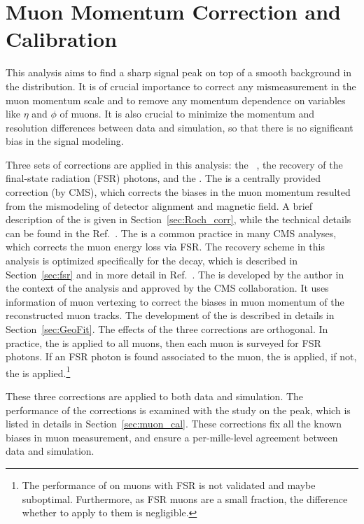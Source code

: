 \chapter{Muon Momentum Correction and Calibration} \label{chp:muon_corr}

This analysis aims to find a sharp signal peak on top of a smooth background in the \mmm distribution.
It is of crucial importance to correct any mismeasurement in the muon momentum scale 
and to remove any momentum dependence on variables like $\eta$ and $\phi$ of muons.
It is also crucial to minimize the momentum and resolution differences between data and simulation, 
so that there is no significant bias in the signal modeling.

Three sets of corrections are applied in this analysis: 
the \RochCorr~\cite{Bodek:2012id}, the recovery of the final-state radiation (FSR) photons, and the \GeoFit.
The \RochCorr is a centrally provided correction (by CMS), which corrects 
the biases in the muon momentum resulted from the mismodeling of detector alignment and magnetic field. 
A brief description of the \RochCorr is given in Section~\ref{sec:Roch_corr}, 
while the technical details can be found in the Ref.~\cite{Bodek:2012id}.
The \FSR is a common practice in many CMS analyses, which corrects the muon energy loss via FSR.
The recovery scheme in this analysis is optimized specifically for the \hmm decay, which is described in Section~\ref{sec:fsr} and in more detail in Ref.~\cite{oliverthesis}.
The \GeoFit is developed by the author in the context of the \hmm analysis and approved by the CMS collaboration.
It uses information of muon vertexing to correct the biases in muon momentum of the reconstructed muon tracks.
The development of the \GeoFit is described in details in Section~\ref{sec:GeoFit}.
The effects of the three corrections are orthogonal.
In practice, the \RochCorr is applied to all muons, then each muon is surveyed for FSR photons.
If an FSR photon is found associated to the muon, the \FSR is applied, 
if not, the \GeoFit is applied.\footnote{The performance of \GeoFit on muons with FSR is not validated and maybe suboptimal. 
Furthermore, as FSR muons are a small fraction, the difference whether to apply \GeoFit to them is negligible.}

These three corrections are applied to both data and simulation.
The performance of the corrections is examined with the study on the \zmm peak,
which is listed in details in Section~\ref{sec:muon_cal}.
These corrections fix all the known biases in muon measurement, 
and ensure a per-mille-level agreement between data and simulation. 

